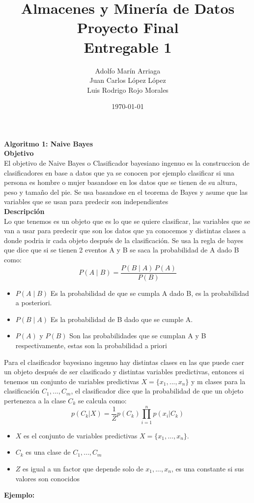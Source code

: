 \documentclass{article}
\title{Almacenes y Minería de Datos \\Proyecto Final\\ Entregable 1}
\author{Adolfo Marín Arriaga\\Juan Carlos López López\\Luis Rodrigo Rojo Morales}
\date{\today\\}
\begin{document}
 \maketitle
 
 {\bf Algoritmo 1: Naive Bayes}\\
 
 {\bf Objetivo}\\
 
 El objetivo de Naive Bayes o Clasificador bayesiano ingenuo es la construccion de clasificadores en base a datos que ya se conocen por ejemplo clasificar si una persona es hombre o mujer basandose
 en los datos que se tienen de su altura, peso y tamaño del pie. Se usa basandose en el teorema de Bayes y asume que las variables que se usan para predecir son 
 independientes\\
 
 {\bf Descripción}\\
 
 Lo que tenemos es un objeto que es lo que se quiere clasificar, las variables que se van a usar para predecir que son los datos que ya conocemos y distintas clases a donde podria 
 ir cada objeto después de la clasificación. Se usa la regla de bayes que dice que si se tienen 2 eventos A y B se saca la probabilidad de A dado B como:
 $$ P(A \mid B) = \frac{P(B \mid A) \, P(A)}{P(B)} $$
 \begin{itemize}
  \item $P(A \mid B)$ Es la probabilidad de que se cumpla  A dado B, es la probabilidad a posteriori.
  \item $P(B \mid A)$ Es la probabilidad de B dado que se cumple A.
  \item $P(A)$ y $P(B)$ Son las probabilidades que se cumplan A y B respectivamente, estas son la probabilidad a priori
 \end{itemize}
 Para el clasificador bayesiano ingenuo hay distintas clases en las que puede caer un objeto después de ser clasificado y distintas variables predictivas, entonces
 si tenemos un conjunto de variables predictivas $X=\{x_1,...,x_n\}$ y m clases para la clasificación $C_1,...,C_m$, el clasificador dice que la 
 probabilidad de que un objeto pertenezca a la clase $C_k$ se calcula como:
 \begin{equation*}
 p(C_k|X)=\frac{1}{Z}p(C_k)\prod_{i=1}^{n}p(x_i|C_k)
 \end{equation*}
 \begin{itemize}
  \item $X$ es el conjunto de variables predictivas $X=\{x_1,...,x_n\}$.
  \item $C_k$ es una clase de $C_1,...,C_m$
  \item $Z$ es igual a un factor que depende solo de $x_1,...,x_n$, es una constante si sus valores son conocidos
 
 \end{itemize}
{\bf Ejemplo:}\\
 
\end{document}
